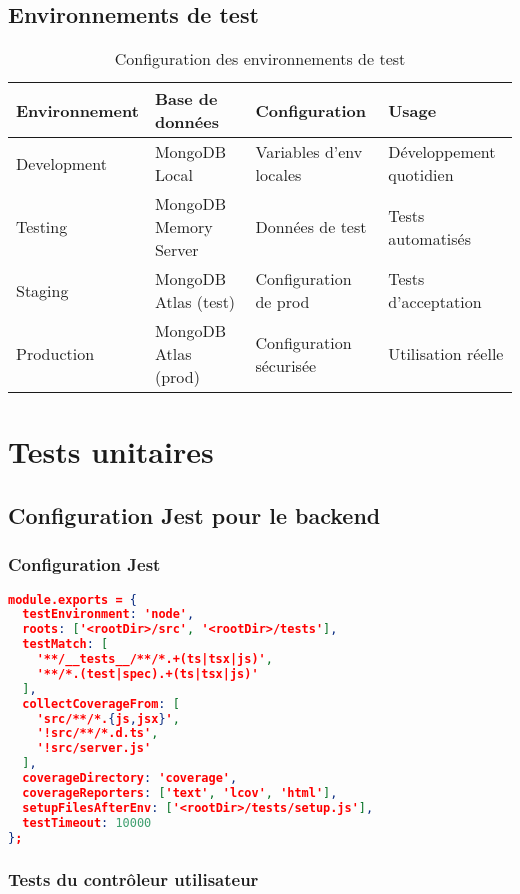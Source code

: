 \subsection{Environnements de test}

\begin{table}[H]
\centering
\caption{Configuration des environnements de test}
\begin{tabular}{|l|p{4cm}|p{4cm}|p{4cm}|}
\hline
\textbf{Environnement} & \textbf{Base de données} & \textbf{Configuration} & \textbf{Usage} \\
\hline
Development & MongoDB Local & Variables d'env locales & Développement quotidien \\
Testing & MongoDB Memory Server & Données de test & Tests automatisés \\
Staging & MongoDB Atlas (test) & Configuration de prod & Tests d'acceptation \\
Production & MongoDB Atlas (prod) & Configuration sécurisée & Utilisation réelle \\
\hline
\end{tabular}
\end{table}

\section{Tests unitaires}

\subsection{Configuration Jest pour le backend}

\subsubsection{Configuration Jest}

\begin{lstlisting}[language=JSON, caption=jest.config.js]
module.exports = {
  testEnvironment: 'node',
  roots: ['<rootDir>/src', '<rootDir>/tests'],
  testMatch: [
    '**/__tests__/**/*.+(ts|tsx|js)',
    '**/*.(test|spec).+(ts|tsx|js)'
  ],
  collectCoverageFrom: [
    'src/**/*.{js,jsx}',
    '!src/**/*.d.ts',
    '!src/server.js'
  ],
  coverageDirectory: 'coverage',
  coverageReporters: ['text', 'lcov', 'html'],
  setupFilesAfterEnv: ['<rootDir>/tests/setup.js'],
  testTimeout: 10000
};
\end{lstlisting}

\subsubsection{Tests du contrôleur utilisateur}

